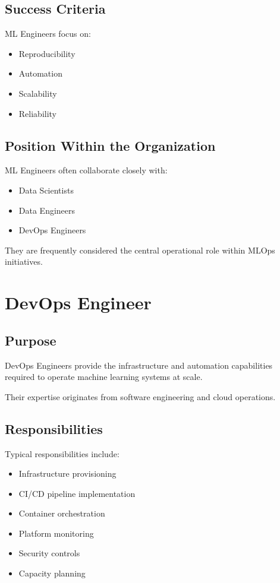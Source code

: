 \subsection{Success Criteria}

ML Engineers focus on:

\begin{itemize}
    \item Reproducibility
    \item Automation
    \item Scalability
    \item Reliability
\end{itemize}

\subsection{Position Within the Organization}

ML Engineers often collaborate closely with:

\begin{itemize}
    \item Data Scientists
    \item Data Engineers
    \item DevOps Engineers
\end{itemize}

They are frequently considered the central operational role within MLOps initiatives.

\section{DevOps Engineer}

\subsection{Purpose}

DevOps Engineers provide the infrastructure and automation capabilities required to operate machine learning systems at scale.

Their expertise originates from software engineering and cloud operations.

\subsection{Responsibilities}

Typical responsibilities include:

\begin{itemize}
    \item Infrastructure provisioning
    \item CI/CD pipeline implementation
    \item Container orchestration
    \item Platform monitoring
    \item Security controls
    \item Capacity planning
\end{itemize}

